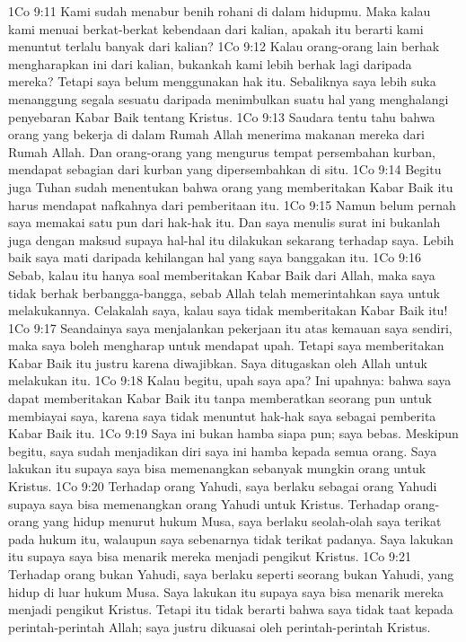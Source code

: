 1Co 9:11  Kami sudah menabur benih rohani di dalam hidupmu. Maka kalau kami menuai berkat-berkat kebendaan dari kalian, apakah itu berarti kami menuntut terlalu banyak dari kalian?
1Co 9:12  Kalau orang-orang lain berhak mengharapkan ini dari kalian, bukankah kami lebih berhak lagi daripada mereka? Tetapi saya belum menggunakan hak itu. Sebaliknya saya lebih suka menanggung segala sesuatu daripada menimbulkan suatu hal yang menghalangi penyebaran Kabar Baik tentang Kristus.
1Co 9:13  Saudara tentu tahu bahwa orang yang bekerja di dalam Rumah Allah menerima makanan mereka dari Rumah Allah. Dan orang-orang yang mengurus tempat persembahan kurban, mendapat sebagian dari kurban yang dipersembahkan di situ.
1Co 9:14  Begitu juga Tuhan sudah menentukan bahwa orang yang memberitakan Kabar Baik itu harus mendapat nafkahnya dari pemberitaan itu.
1Co 9:15  Namun belum pernah saya memakai satu pun dari hak-hak itu. Dan saya menulis surat ini bukanlah juga dengan maksud supaya hal-hal itu dilakukan sekarang terhadap saya. Lebih baik saya mati daripada kehilangan hal yang saya banggakan itu.
1Co 9:16  Sebab, kalau itu hanya soal memberitakan Kabar Baik dari Allah, maka saya tidak berhak berbangga-bangga, sebab Allah telah memerintahkan saya untuk melakukannya. Celakalah saya, kalau saya tidak memberitakan Kabar Baik itu!
1Co 9:17  Seandainya saya menjalankan pekerjaan itu atas kemauan saya sendiri, maka saya boleh mengharap untuk mendapat upah. Tetapi saya memberitakan Kabar Baik itu justru karena diwajibkan. Saya ditugaskan oleh Allah untuk melakukan itu.
1Co 9:18  Kalau begitu, upah saya apa? Ini upahnya: bahwa saya dapat memberitakan Kabar Baik itu tanpa memberatkan seorang pun untuk membiayai saya, karena saya tidak menuntut hak-hak saya sebagai pemberita Kabar Baik itu.
1Co 9:19  Saya ini bukan hamba siapa pun; saya bebas. Meskipun begitu, saya sudah menjadikan diri saya ini hamba kepada semua orang. Saya lakukan itu supaya saya bisa memenangkan sebanyak mungkin orang untuk Kristus.
1Co 9:20  Terhadap orang Yahudi, saya berlaku sebagai orang Yahudi supaya saya bisa memenangkan orang Yahudi untuk Kristus. Terhadap orang-orang yang hidup menurut hukum Musa, saya berlaku seolah-olah saya terikat pada hukum itu, walaupun saya sebenarnya tidak terikat padanya. Saya lakukan itu supaya saya bisa menarik mereka menjadi pengikut Kristus.
1Co 9:21  Terhadap orang bukan Yahudi, saya berlaku seperti seorang bukan Yahudi, yang hidup di luar hukum Musa. Saya lakukan itu supaya saya bisa menarik mereka menjadi pengikut Kristus. Tetapi itu tidak berarti bahwa saya tidak taat kepada perintah-perintah Allah; saya justru dikuasai oleh perintah-perintah Kristus.
